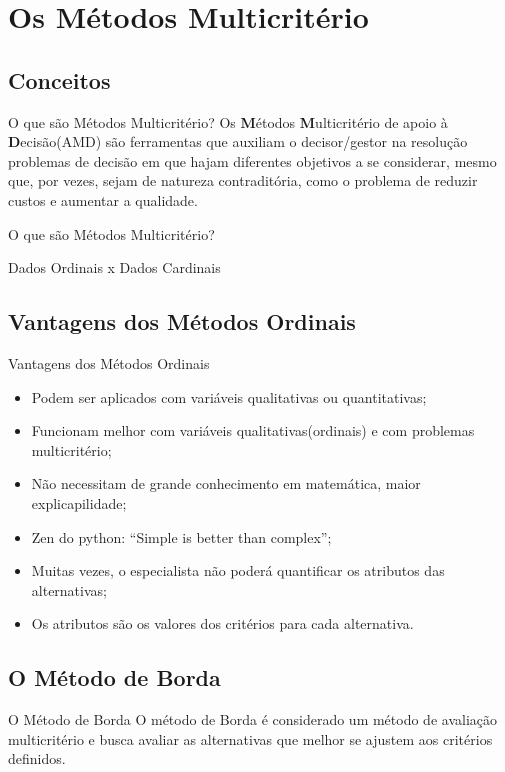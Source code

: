 \documentclass[aspectratio=169]{beamer}
\begin{document}
\section{Os Métodos Multicritério}
\subsection{Conceitos}
\begin{frame}{O que são Métodos Multicritério?}
Os \textbf{M}étodos \textbf{M}ulticritério de apoio à \textbf{D}ecisão(AMD) são ferramentas que auxiliam o decisor/gestor na resolução problemas de decisão em que hajam diferentes objetivos a se considerar, mesmo que, por vezes, sejam de natureza contraditória, como o problema de reduzir custos e aumentar a qualidade. \cite{Almeida2011}
\end{frame}


\begin{frame}{O que são Métodos Multicritério?}
    \begin{block}{}
        Dados Ordinais x Dados Cardinais
    \end{block}
\end{frame}


\subsection{Vantagens dos Métodos Ordinais}
\begin{frame}{Vantagens dos Métodos Ordinais}
    \begin{itemize}
\item Podem ser aplicados com variáveis qualitativas ou quantitativas;
\item Funcionam melhor com variáveis qualitativas(ordinais) e com problemas multicritério;
\item Não necessitam de grande conhecimento em matemática, maior explicapilidade;
\item Zen do python: “Simple is better than complex”;
\item Muitas vezes, o especialista não poderá quantificar os atributos das alternativas;
\item Os atributos são os valores dos critérios para cada alternativa.
    \end{itemize}
\end{frame}

\subsection{O Método de Borda}
\begin{frame}{O Método de Borda}
    O método de Borda é considerado um método de avaliação multicritério e busca avaliar as alternativas que melhor se ajustem aos critérios definidos. \cite{Barros2020}
\end{frame}
\end{document}
